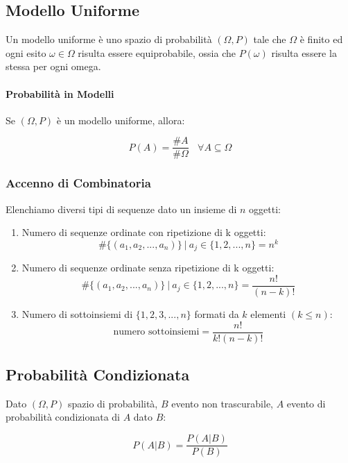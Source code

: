 \documentclass{article}
\begin{document}

\subsection{Modello Uniforme}

Un modello uniforme è uno spazio di probabilità $(\Omega, P)$ tale che $\Omega$ è finito ed ogni esito $\omega \in \Omega$ risulta essere equiprobabile, ossia che
$P(\omega)$ risulta essere la stessa per ogni omega.

\paragraph{Probabilità in Modelli} Se $(\Omega, P)$ è un modello uniforme, allora:

\[ P(A) = \frac{\#A}{\#\Omega} \:\:\:\: \forall A \subseteq \Omega \]

\newpage

\subsubsection{Accenno di Combinatoria}

Elenchiamo diversi tipi di sequenze dato un insieme di $n$ oggetti:

\begin{enumerate}
    \item Numero di sequenze ordinate con ripetizione di k oggetti:
    \[ \#\{ (a_{1}, a_{2}, ... , a_{n}) \} \: | \: a_{j} \in \{ 1,2, ..., n \} = n^{k}\]
    \item Numero di sequenze ordinate senza ripetizione di k oggetti:
    \[ \#\{ (a_{1}, a_{2}, ... , a_{n}) \} \: | \: a_{j} \in \{ 1,2, ..., n \} = \frac{n!}{(n-k)!} \]
    \item Numero di sottoinsiemi di $\{ 1,2,3, ... ,n \}$ formati da $k$ elementi $(k \leq n)$:
    \[ \text{numero sottoinsiemi} = \frac{n!}{k!(n-k)!} \]
\end{enumerate}

\subsection{Probabilità Condizionata}

Dato $(\Omega, P)$ spazio di probabilità, $B$ evento non trascurabile, $A$ evento di probabilità condizionata di $A$ dato $B$:

\[ P(A|B) = \frac{P(A|B)}{P(B)} \]
\end{document}
